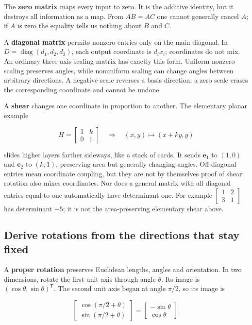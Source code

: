 The \textbf{zero matrix} maps every input to zero. It is the additive identity, but it destroys all information as a map. From \(AB=AC\) one cannot generally cancel \(A\); if \(A\) is zero the equality tells us nothing about \(B\) and \(C\).

A \textbf{diagonal matrix} permits nonzero entries only on the main diagonal. In \(D=\operatorname{diag}(d_1,d_2,d_3)\), each output coordinate is \(d_ix_i\); coordinates do not mix. An ordinary three-axis scaling matrix has exactly this form. Uniform nonzero scaling preserves angles, while nonuniform scaling can change angles between arbitrary directions. A negative scale reverses a basis direction; a zero scale erases the corresponding coordinate and cannot be undone.

A \textbf{shear} changes one coordinate in proportion to another. The elementary planar example

\[
H=\begin{bmatrix}1&k\\0&1\end{bmatrix}
\quad\Longrightarrow\quad(x,y)\mapsto(x+ky,y)
\]

slides higher layers farther sideways, like a stack of cards. It sends \(\mathbf e_1\) to \((1,0)\) and \(\mathbf e_2\) to \((k,1)\), preserving area but generally changing angles. Off-diagonal entries mean coordinate coupling, but they are not by themselves proof of shear: rotation also mixes coordinates. Nor does a general matrix with all diagonal entries equal to one automatically have determinant one. For example \(\begin{bmatrix}1&2\\3&1\end{bmatrix}\) has determinant \(-5\); it is not the area-preserving elementary shear above.

\subsection{Derive rotations from the directions that stay fixed}\label{01-foundations-i-ch018-derive-rotations-from-the-directions-that-stay-fixed}

A \textbf{proper rotation} preserves Euclidean lengths, angles and orientation. In two dimensions, rotate the first unit axis through angle \(\theta\). Its image is \((\cos\theta,\sin\theta)^{\mathsf T}\). The second unit axis began at angle \(\pi/2\), so its image is

\[
\begin{bmatrix}\cos(\pi/2+\theta)\\\sin(\pi/2+\theta)\end{bmatrix}
=\begin{bmatrix}-\sin\theta\\\cos\theta\end{bmatrix}.
\]


